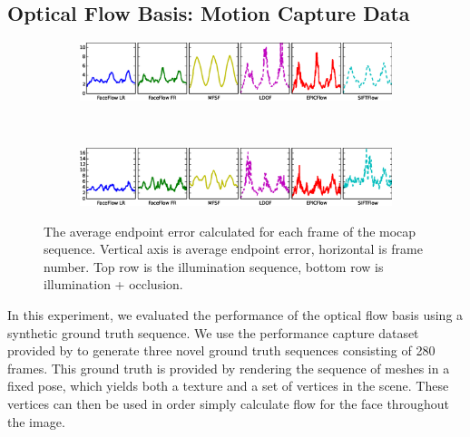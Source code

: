 \subsection{Optical Flow Basis: Motion Capture Data}\label{subsec:face_flow_experiments_mocap}
\begin{figure}
    \centering
    \begin{subfigure}{6in}
        \centering
        \includegraphics[width=\textwidth]{face_flow/images/synthetic/frame_error_5_flat}
    \end{subfigure}  \\
    \begin{subfigure}{6in}
        \centering
        \includegraphics[width=\textwidth]{face_flow/images/synthetic/frame_error_6_flat}
    \end{subfigure}
    \caption{The average endpoint error calculated for each frame of the mocap
             sequence. Vertical axis is average endpoint error, horizontal is
             frame number. Top row is the illumination sequence, bottom row is
             illumination + occlusion.}
\label{fig:face_flow_per_frame_error}
\end{figure}
In this experiment, we evaluated the performance of the optical flow basis
using a synthetic ground truth sequence. We use the performance capture
dataset provided by \citet{zhang2004spacetime}
to generate three novel ground truth sequences consisting of 280 frames.
This ground truth is provided by rendering
the sequence of meshes in a fixed pose, which yields both a texture and a set of vertices
in the scene. These vertices can then be used in order simply calculate flow for the face
throughout the image.

